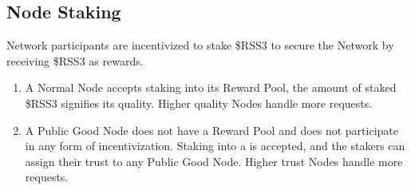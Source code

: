 \subsection{Node Staking}
Network participants are incentivized to stake \$RSS3 to secure the Network by receiving \$RSS3 as rewards.
\begin{enumerate}
    \item A Normal Node accepts staking into its Reward Pool, the amount of staked \$RSS3 signifies its quality. Higher quality Nodes handle more requests.
    \item A Public Good Node does not have a Reward Pool and does not participate in any form of incentivization. Staking into a  is accepted, and the stakers can assign their trust to any Public Good Node. Higher trust Nodes handle more requests.
\end{enumerate}

